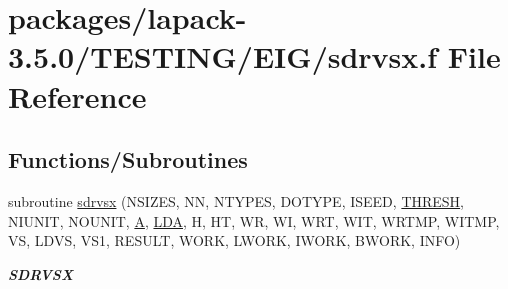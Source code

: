 \hypertarget{sdrvsx_8f}{}\section{packages/lapack-\/3.5.0/\+T\+E\+S\+T\+I\+N\+G/\+E\+I\+G/sdrvsx.f File Reference}
\label{sdrvsx_8f}
\subsection*{Functions/\+Subroutines}
\begin{DoxyCompactItemize}
\item 
subroutine \hyperlink{group__single__eig_ga411333994f433776dd07049fe3973a66}{sdrvsx} (N\+S\+I\+Z\+E\+S, N\+N, N\+T\+Y\+P\+E\+S, D\+O\+T\+Y\+P\+E, I\+S\+E\+E\+D, \hyperlink{zlaqgs_8c_a0656018abfc9fa2821827415f5d5ea57}{T\+H\+R\+E\+S\+H}, N\+I\+U\+N\+I\+T, N\+O\+U\+N\+I\+T, \hyperlink{classA}{A}, \hyperlink{example__user_8c_ae946da542ce0db94dced19b2ecefd1aa}{L\+D\+A}, H, H\+T, W\+R, W\+I, W\+R\+T, W\+I\+T, W\+R\+T\+M\+P, W\+I\+T\+M\+P, V\+S, L\+D\+V\+S, V\+S1, R\+E\+S\+U\+L\+T, W\+O\+R\+K, L\+W\+O\+R\+K, I\+W\+O\+R\+K, B\+W\+O\+R\+K, I\+N\+F\+O)
\begin{DoxyCompactList}\small\item\em {\bfseries S\+D\+R\+V\+S\+X} \end{DoxyCompactList}\end{DoxyCompactItemize}
